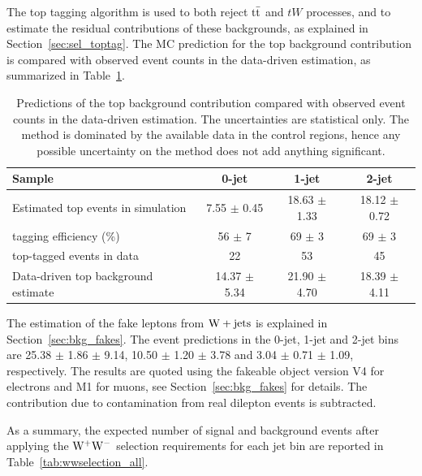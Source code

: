 The top tagging algorithm is used to both reject $\mathrm{t}\bar{\mathrm{t}}$ and $tW$ processes, 
and to estimate the residual contributions of these backgrounds, as explained in 
Section~\ref{sec:sel_toptag}. The MC prediction for the top background contribution is 
compared with observed event counts in the data-driven estimation,
as summarized in Table~\ref{tab:dyest_nomet}.

\begin{table}
\begin{center}
\begin{tabular}{l c c c}
\hline
Sample                                        &   0-jet           & 1-jet           & 2-jet               \\
\hline
Estimated top events in simulation  	      &   7.55 $\pm$ 0.45 & 18.63 $\pm$ 1.33& 18.12 $\pm$ 0.72	  \\
tagging efficiency (\%)                       &    56  $\pm$  7   &  69  $\pm$ 3    &  69  $\pm$  3	  \\
top-tagged events in data           	      &          22       &       53        &        45  	  \\
Data-driven top background estimate           &  14.37 $\pm$ 5.34 & 21.90 $\pm$ 4.70& 18.39 $\pm$ 4.11    \\
\hline
\end{tabular}
\end{center}
\caption{Predictions of the top background contribution compared 
with observed event counts in the data-driven estimation. The uncertainties are 
statistical only. The method is dominated by the available data in the control regions, 
hence any possible uncertainty on the method does not add anything significant.}
\label{tab:dyest_nomet}
\end{table}

The estimation of the fake leptons from $\mathrm{W+jets}$ is explained in 
Section~\ref{sec:bkg_fakes}. The event predictions in the 0-jet, 1-jet 
and 2-jet bins are 25.38 $\pm$ 1.86 $\pm$ 9.14, 10.50 $\pm$ 1.20 $\pm$ 3.78 and 
3.04 $\pm$ 0.71 $\pm$ 1.09, respectively. The results are quoted using the 
fakeable object version V4 for electrons and M1 for muons, see Section~\ref{sec:bkg_fakes} 
for details. The contribution due to contamination from real dilepton events is subtracted.

As a summary, the expected number of signal and background events after 
applying the $\mathrm{W}^+\mathrm{W}^-$ selection requirements for each jet bin are reported in 
Table~\ref{tab:wwselection_all}. 

